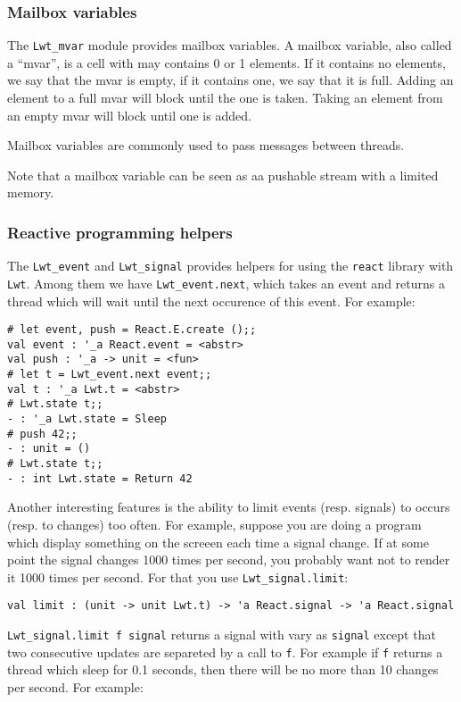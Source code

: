 \documentclass{article}
\newcommand{\lwt}{\texttt{Lwt}\xspace}
\begin{document}
\subsubsection{Mailbox variables}

The \texttt{Lwt\_mvar} module provides mailbox variables. A mailbox
variable, also called a ``mvar'', is a cell with may contains 0 or 1
elements. If it contains no elements, we say that the mvar is empty,
if it contains one, we say that it is full. Adding an element to a
full mvar will block until the one is taken. Taking an element from an
empty mvar will block until one is added.

Mailbox variables are commonly used to pass messages between threads.

Note that a mailbox variable can be seen as aa pushable stream with a
limited memory.

\subsubsection{Reactive programming helpers}

The \texttt{Lwt\_event} and \texttt{Lwt\_signal} provides helpers for
using the \texttt{react} library with \lwt. Among them we have
\texttt{Lwt\_event.next}, which takes an event and returns a thread
which will wait until the next occurence of this event. For example:

\begin{verbatim}
# let event, push = React.E.create ();;
val event : '_a React.event = <abstr>
val push : '_a -> unit = <fun>
# let t = Lwt_event.next event;;
val t : '_a Lwt.t = <abstr>
# Lwt.state t;;
- : '_a Lwt.state = Sleep
# push 42;;
- : unit = ()
# Lwt.state t;;
- : int Lwt.state = Return 42
\end{verbatim}

Another interesting features is the ability to limit events
(resp. signals) to occurs (resp. to changes) too often. For example,
suppose you are doing a program which display something on the screeen
each time a signal change. If at some point the signal changes 1000
times per second, you probably want not to render it 1000 times per
second. For that you use \texttt{Lwt\_signal.limit}:

\begin{verbatim}
val limit : (unit -> unit Lwt.t) -> 'a React.signal -> 'a React.signal
\end{verbatim}

\texttt{Lwt\_signal.limit f signal} returns a signal with vary as
\texttt{signal} except that two consecutive updates are separeted by a
call to \texttt{f}. For example if \texttt{f} returns a thread which
sleep for 0.1 seconds, then there will be no more than 10 changes per
second. For example:
\end{document}
